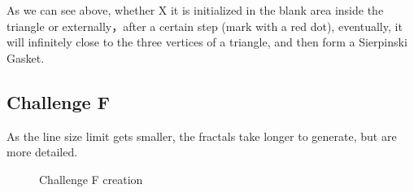 \documentclass[12pt]{article}
\begin{document}
As we can see above, whether X it is initialized in the blank area inside the triangle or externally，after a certain step (mark with a red dot), eventually, it will infinitely close to the three vertices of a triangle, and then form a Sierpinski Gasket.


\subsection{Challenge F}
As the line size limit gets smaller, the fractals take longer to generate, but are more detailed.


\begin{figure}[htbp] 
\centering 
{}%
%
\centering 
\caption{Challenge F creation}
\end{figure}
\end{document}
